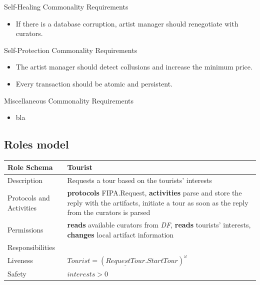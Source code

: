 \documentclass[a4paper, 11pt]{article}
\begin{document}
Self-Healing Commonality Requirements
\begin{itemize}
\item If there is a database corruption, artist manager should renegotiate with curators. 
\end{itemize}

Self-Protection Commonality Requirements
\begin{itemize}
\item The artist manager should detect collusions and increase the minimum price.
\item Every transaction should be atomic and persistent.
\end{itemize}

Miscellaneous Commonality Requirements
\begin{itemize}
\item bla
\end{itemize}

\subsection{Roles model}

\begin{table}[H]
	\label{my-label}
	\begin{tabular}{l p{7cm}}
		\hline
		Role Schema              & Tourist \\
		\hline
		Description              & Requests a tour based on the tourists' interests \\
		Protocols and Activities & \textbf{protocols} FIPA.Request, \textbf{activities} parse and store the reply with the artifacts, initiate a tour as soon as the reply from the curators is parsed \\
		Permissions              & \textbf{reads} available curators from \textit{DF}, \textbf{reads} tourists' interests, \textbf{changes} local artifact information \\
		\hline
		Responsibilities         &                   \\
		Liveness                 & \(Tourist=(\underline{RequestTour}.StartTour)^\omega \) \\
		Safety                   & \(interests > 0 \) \\
		\hline
	\end{tabular}
\end{table}
\end{document}
